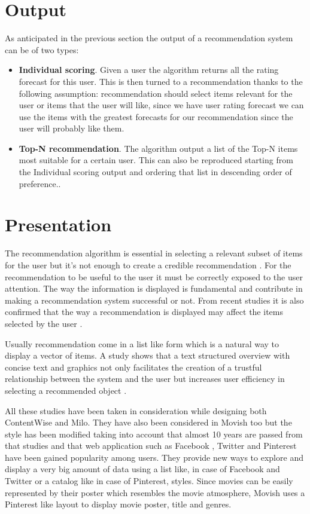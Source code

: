 \section{Output}
\label{sec:Output}

As anticipated in the previous section the output of a recommendation system can be of two types:

\begin{itemize}
\item \textbf{Individual scoring}. Given a user the algorithm returns all the rating forecast for this user. This is then turned to a recommendation thanks to the following assumption: recommendation should select items relevant for the user or items that the user will like, since we have user rating forecast we can use the items with the greatest forecasts for our recommendation since the user will probably like them. 
\item \textbf{Top-N recommendation}. The algorithm output a list of the Top-N items most suitable for a certain user. This can also be reproduced starting from the Individual scoring output and ordering that list in descending order of preference..
\end{itemize}

\section{Presentation}
\label{sec:Presentation}

The recommendation algorithm is essential in selecting a relevant subset of items for the user but it's not enough to create a credible recommendation \cite{applicaion-domain-and-functional-classification}. For the recommendation to be useful to the user it must be correctly exposed to the user attention. The way the information is displayed is fundamental and contribute in making a recommendation system successful or not. From recent studies it is also confirmed that the way a recommendation is displayed may affect the items selected by the user \cite{amazon-case}.

Usually recommendation come in a list like form which is a natural way to display a vector of items. A study shows that a text structured overview with concise text and graphics not only facilitates the creation of a trustful relationship between the system and the user but increases user efficiency in selecting a recommended object \cite{trust-building}.

All these studies have been taken in consideration while designing both ContentWise and Milo. They have also been considered in Movish too but the style has been modified taking into account that almost 10 years are passed from that studies and that web application such as Facebook \cite{facebook}, Twitter \cite{twitter} and Pinterest \cite{pinterest} have been gained popularity among users. They provide new ways to explore and display a very big amount of data using a list like, in case of Facebook and Twitter or a catalog like in case of Pinterest, styles. Since movies can be easily represented by their poster which resembles the movie atmosphere, Movish uses a Pinterest like layout to display movie poster, title and genres.

